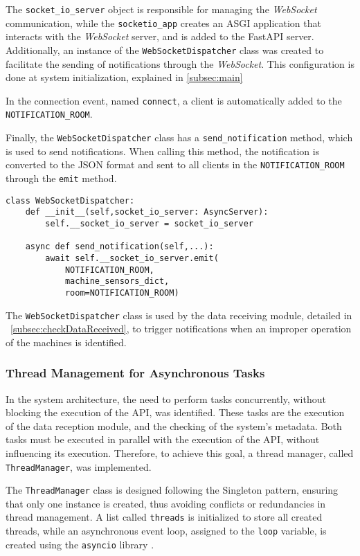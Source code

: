 The \texttt{socket\_io\_server} object is responsible for managing the \textit{WebSocket} communication, while the \texttt{socketio\_app} creates an \gls{ASGI} application that interacts with the \textit{WebSocket} server, and is added to the FastAPI server. Additionally, an instance of the \texttt{WebSocketDispatcher} class was created to facilitate the sending of notifications through the \textit{WebSocket}. This configuration is done at system initialization, explained in \ref{subsec:main}

In the connection event, named \texttt{connect}, a client is automatically added to the \texttt{NOTIFICATION\_ROOM}.

Finally, the \texttt{WebSocketDispatcher} class has a \texttt{send\_notification} method, which is used to send notifications. When calling this method, the notification is converted to the JSON format and sent to all clients in the \texttt{NOTIFICATION\_ROOM} through the \texttt{emit} method.

\begin{Verbatim}[fontsize=\small, baselinestretch=0.6]
class WebSocketDispatcher:
    def __init__(self,socket_io_server: AsyncServer):
        self.__socket_io_server = socket_io_server
    
    async def send_notification(self,...):
        await self.__socket_io_server.emit(
            NOTIFICATION_ROOM,
            machine_sensors_dict,
            room=NOTIFICATION_ROOM)
\end{Verbatim}

The \texttt{WebSocketDispatcher} class is used by the data receiving module, detailed in ~\ref{subsec:checkDataReceived}, to trigger notifications when an improper operation of the machines is identified.

\subsubsection{Thread Management for Asynchronous Tasks}\label{subsubsec:ThreadManager}
In the system architecture, the need to perform tasks concurrently, without blocking the execution of the \gls{API}, was identified. These tasks are the execution of the data reception module, and the checking of the system's metadata. Both tasks must be executed in parallel with the execution of the \gls{API}, without influencing its execution. Therefore, to achieve this goal, a thread manager, called \texttt{ThreadManager}, was implemented.

The \texttt{ThreadManager} class is designed following the Singleton pattern, ensuring that only one instance is created, thus avoiding conflicts or redundancies in thread management. A list called \texttt{threads} is initialized to store all created threads, while an asynchronous event loop, assigned to the \texttt{loop} variable, is created using the \texttt{asyncio} library \cite{pythonAsyncio}.

